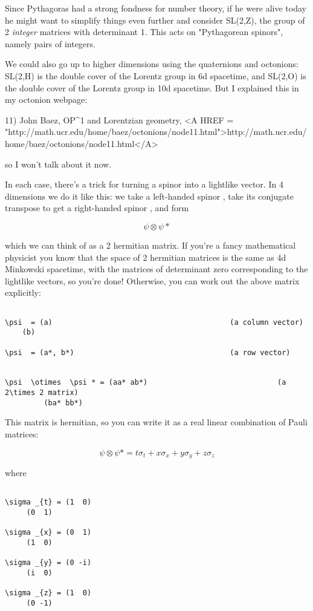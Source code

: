 Since Pythagoras had a strong fondness for number theory, if he 
were alive today he might want to simplify things even further 
and consider SL(2,Z), the group of 2 \emph{integer} matrices with 
determinant 1.  This acts on "Pythagorean spinors", namely pairs 
of integers.

We could also go up to higher dimensions using the quaternions
and octonions: SL(2,H) is the double cover of the Lorentz
group in 6d spacetime, and SL(2,O) is the double cover of the
Lorentz group in 10d spacetime.  But I explained this in my
octonion webpage:

11) John Baez, OP^{1} and Lorentzian geometry, 
<A HREF = "http://math.ucr.edu/home/baez/octonions/node11.html">http://math.ucr.edu/home/baez/octonions/node11.html</A>

so I won't talk about it now.

In each case, there's a trick for turning a spinor into a 
lightlike vector.  In 4 dimensions we do it like this: we 
take a left-handed spinor \psi , take its conjugate transpose 
to get a right-handed spinor \psi *, and form 


$$

\psi  \otimes  \psi *
$$
    
which we can think of as a 2 hermitian matrix.   If you're
a fancy mathematical physicist you know that the space of 
2 hermitian matrices is the same as 4d Minkowski spacetime, 
with the matrices of determinant zero corresponding to the 
lightlike vectors, so you're done!  Otherwise, you can work 
out the above matrix explicitly:


\begin{verbatim}

\psi  = (a)                                         (a column vector)
    (b)

\psi  = (a*, b*)                                    (a row vector)


\psi  \otimes  \psi * = (aa* ab*)                              (a 2\times 2 matrix)
         (ba* bb*)                  
\end{verbatim}
    
This matrix is hermitian, so you can write it as a real 
linear combination of Pauli matrices:


$$

\psi  \otimes  \psi * = t \sigma _{t} + x \sigma _{x} + y \sigma _{y} + z \sigma _{z}
$$
    
where


\begin{verbatim}

\sigma _{t} = (1  0)
     (0  1)

\sigma _{x} = (0  1)
     (1  0)

\sigma _{y} = (0 -i)
     (i  0)

\sigma _{z} = (1  0)
     (0 -1)
\end{verbatim}
    
